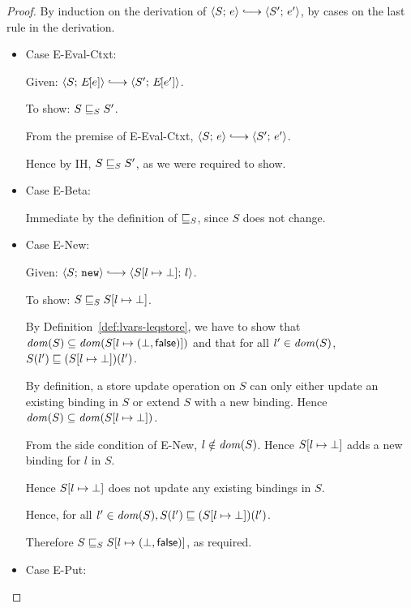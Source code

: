 \LVarsLemMonotonicity
\begin{proof}
  By induction on the derivation of $\config{S}{e} \parstepsto
  \config{S'}{e'}$, by cases on the last rule in the derivation.

  \begin{itemize}

    \item Case {\sc E-Eval-Ctxt}:

      Given: $\config{S}{\E{e}} \parstepsto \config{S'}{\E{e'}}$.

      To show: $S \sqsubseteq_S S'$.

      From the premise of {\sc E-Eval-Ctxt}, $\config{S}{e}
      \parstepsto \config{S'}{e'}$.

      Hence by IH, $S \sqsubseteq_S S'$, as we were required to show.

    \item Case {\sc E-Beta}:

      Immediate by the definition of $ \sqsubseteq_S $, since $S$ does
      not change.

    \item Case {\sc E-New}:

      Given: $\config{S}{\NEW} \parstepsto
      \config{\extSRaw{S}{l}{\bot}}{l}$.

      To show: $S \sqsubseteq_S S[l \mapsto \bot]$.

      By Definition~\ref{def:lvars-leqstore}, we have to show that
      $\mathit{dom}(S) \subseteq \mathit{dom}(S[l \mapsto (\bot, \textsf{false})])$ and
      that for all $l' \in \mathit{dom}(S)$, $S(l') \sqsubseteq
      (S[l \mapsto \bot])(l')$.

      By definition, a store update operation on $S$ can only either
      update an existing binding in $S$ or extend $S$ with a new
      binding.  Hence $\mathit{dom}(S) \subseteq \mathit{dom}(S[l \mapsto \bot])$.

      From the side condition of {\sc E-New}, $l \notin \mathit{dom}(S)$.
      Hence $S[l \mapsto \bot]$ adds a new binding for $l$ in $S$.

      Hence $S[l \mapsto \bot]$ does not update any existing
      bindings in $S$.

      Hence, for all $l' \in \mathit{dom}(S), S(l') \sqsubseteq
      (S[l \mapsto \bot])(l')$.

      Therefore $S \sqsubseteq_S S[l \mapsto (\bot, \textsf{false})]$, as
      required.

    \item Case {\sc E-Put}:


\end{itemize}
\end{proof}
